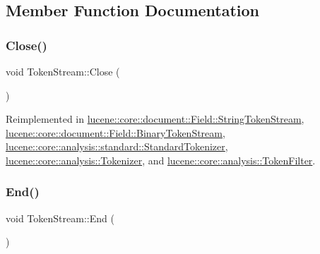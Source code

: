 \subsection{Member Function Documentation}
\mbox{\label{classlucene_1_1core_1_1analysis_1_1TokenStream_ad7963391ddbb2c75610e3738ba5155c8}} 
\subsubsection{\texorpdfstring{Close()}{Close()}}
{\footnotesize\ttfamily void Token\+Stream\+::\+Close (\begin{DoxyParamCaption}{ }\end{DoxyParamCaption})\hspace{0.3cm}{\ttfamily [virtual]}}



Reimplemented in \mbox{\hyperlink{classlucene_1_1core_1_1document_1_1Field_1_1StringTokenStream_acbf15ee849ed8055143c77b96f116cf0}{lucene\+::core\+::document\+::\+Field\+::\+String\+Token\+Stream}}, \mbox{\hyperlink{classlucene_1_1core_1_1document_1_1Field_1_1BinaryTokenStream_a44c200cf1139a926308afdcf27c7638d}{lucene\+::core\+::document\+::\+Field\+::\+Binary\+Token\+Stream}}, \mbox{\hyperlink{classlucene_1_1core_1_1analysis_1_1standard_1_1StandardTokenizer_a108793659fb18bdd695e0c2be91ba730}{lucene\+::core\+::analysis\+::standard\+::\+Standard\+Tokenizer}}, \mbox{\hyperlink{classlucene_1_1core_1_1analysis_1_1Tokenizer_a95c3c0e37e3276be69fa0992b0e45e94}{lucene\+::core\+::analysis\+::\+Tokenizer}}, and \mbox{\hyperlink{classlucene_1_1core_1_1analysis_1_1TokenFilter_a4b991b01385423b87b5714061e4326c8}{lucene\+::core\+::analysis\+::\+Token\+Filter}}.

\mbox{\label{classlucene_1_1core_1_1analysis_1_1TokenStream_a4693985ca7fb242412049a074027b8b5}} 
\subsubsection{\texorpdfstring{End()}{End()}}
{\footnotesize\ttfamily void Token\+Stream\+::\+End (\begin{DoxyParamCaption}{ }\end{DoxyParamCaption})\hspace{0.3cm}{\ttfamily [virtual]}}



